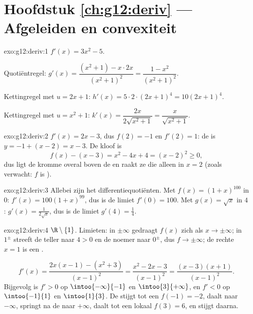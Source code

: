 \section*{Hoofdstuk \ref{ch:g12:deriv} --- Afgeleiden en convexiteit}

\begin{solution}{exo:g12:deriv:1}
$f'(x) = 3x^2 - 5$.

Quotiëntregel:
$g'(x) = \dfrac{(x^2+1) - x\cdot 2x}{(x^2+1)^2} = \dfrac{1 - x^2}{(x^2+1)^2}$.

Kettingregel met $u = 2x+1$: $h'(x) = 5 \cdot 2 \cdot (2x+1)^4 =
10(2x+1)^4$.

Kettingregel met $u = x^2 + 1$:
$k'(x) = \dfrac{2x}{2\sqrt{x^2+1}} = \dfrac{x}{\sqrt{x^2+1}}$.
\end{solution}

\begin{solution}{exo:g12:deriv:2}
$f'(x) = 2x - 3$, dus $f(2) = -1$ en $f'(2) = 1$: de  is
$y = -1 + (x - 2) = x - 3$. De kloof is
\[
f(x) - (x - 3) = x^2 - 4x + 4 = (x-2)^2 \geq 0 ,
\]
dus ligt de kromme overal boven de  en raakt ze die alleen in
$x = 2$ (zoals verwacht: $f$ is ).
\end{solution}

\begin{solution}{exo:g12:deriv:3}
Allebei zijn het differentiequotiënten. Met $f(x) = (1+x)^{100}$ in $0$:
$f'(x) = 100(1+x)^{99}$, dus is de limiet $f'(0) = 100$. Met
$g(x) = \sqrt{x}$ in $4$: $g'(x) = \frac{1}{2\sqrt{x}}$, dus is de limiet
$g'(4) = \frac14$.
\end{solution}

\begin{solution}{exo:g12:deriv:4}
 $\R \setminus \{1\}$. Limieten: in $\pm\infty$ gedraagt $f(x)$ zich
als $x \to \pm\infty$; in $1^\pm$ streeft de teller naar $4 > 0$ en de noemer
naar $0^\pm$, dus $f \to \pm\infty$; de rechte $x = 1$ is een .

\[
f'(x) = \frac{2x(x-1) - (x^2+3)}{(x-1)^2} = \frac{x^2 - 2x - 3}{(x-1)^2}
= \frac{(x-3)(x+1)}{(x-1)^2}.
\]
Bijgevolg is $f' > 0$ op $\intoo{-\infty}{-1}$ en $\intoo{3}{+\infty}$, en
$f' < 0$ op $\intoo{-1}{1}$ en $\intoo{1}{3}$. De  stijgt tot een
 $f(-1) = -2$, daalt naar $-\infty$, springt na de 
naar $+\infty$, daalt tot een lokaal  $f(3) = 6$, en stijgt daarna.
\end{solution}

